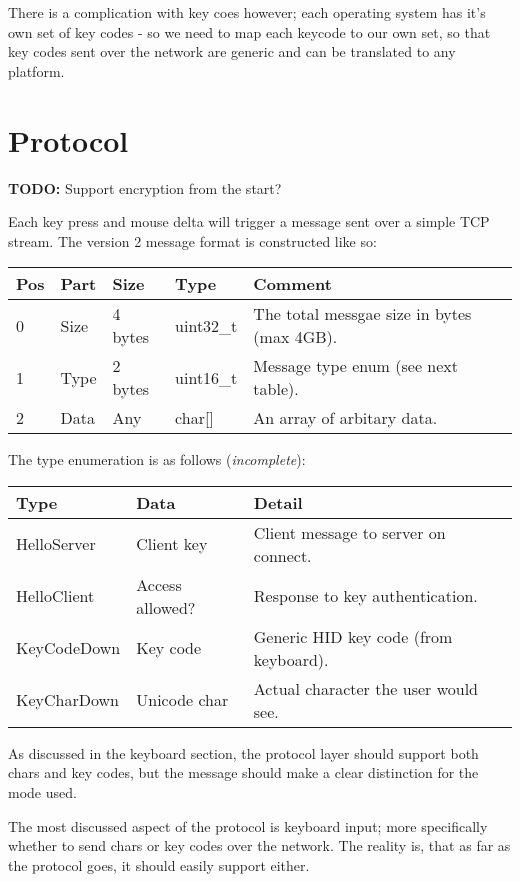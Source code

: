 There is a complication with key coes however; each operating system has it's
own set of key codes - so we need to map each keycode to our own set, so that
key codes sent over the network are generic and can be translated to any 
platform.

\section{Protocol}

\textbf{TODO:} Support encryption from the start?

Each key press and mouse delta will trigger a message sent over a simple TCP 
stream. The version 2 message format is constructed like so:

\begin{tabular}{|l|l|l|l|l|}
\hline
\textbf{Pos} &
\textbf{Part} &
\textbf{Size} &
\textbf{Type} &
\textbf{Comment} \\
\hline
0 & Size & 4 bytes & uint32\_t & The total messgae size in bytes (max 4GB). \\
1 & Type & 2 bytes & uint16\_t & Message type enum (see next table). \\
2 & Data & Any & char[] & An array of arbitary data. \\
\hline
\end{tabular}

The type enumeration is as follows (\textit{incomplete}):

\begin{tabular}{|l|l|l|}
\hline
\textbf{Type} &
\textbf{Data} &
\textbf{Detail} \\
\hline
HelloServer & Client key & Client message to server on connect. \\
HelloClient & Access allowed? & Response to key authentication. \\
KeyCodeDown & Key code & Generic HID key code (from keyboard). \\
KeyCharDown & Unicode char & Actual character the user would see. \\
\hline
\end{tabular}

As discussed in the keyboard section, the protocol layer should support both
chars and key codes, but the message should make a clear distinction for the
mode used.

The most discussed aspect of the protocol is keyboard input; more specifically
whether to send chars or key codes over the network. The reality is, that as far
as the protocol goes, it should easily support either.
